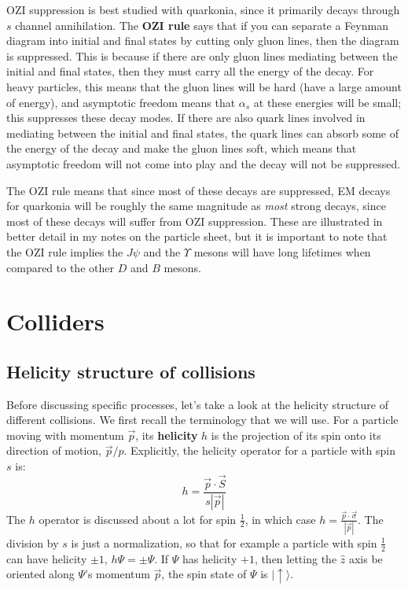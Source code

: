 \documentclass[11pt, oneside]{article}   	%
\theoremstyle{definition}
\numberwithin{equation}{subsection}		%
\begin{document}
OZI suppression is best studied with quarkonia, since it primarily decays through $s$ channel annihilation. The \textbf{OZI rule} 
says that if you can separate a Feynman diagram into initial and final states by cutting only gluon lines, then the diagram is suppressed. 
This is because if there are only gluon lines mediating between the initial and final states, then they must carry all the energy of the decay. 
For heavy particles, this means that the gluon lines will be hard (have a large amount of energy), and asymptotic freedom means that $\alpha_s$ at 
these energies will be small; this suppresses these decay modes. If there are also quark lines involved in mediating between the initial and 
final states, the quark lines can absorb some of the energy of the decay and make the gluon lines soft, which means that asymptotic freedom 
will not come into play and the decay will not be suppressed. 

The OZI rule means that 
since most of these decays are suppressed, EM decays for quarkonia will be roughly the same magnitude as \textit{most} strong decays, since 
most of these decays will suffer from OZI suppression. These are illustrated in better detail in my notes on the particle sheet, but it is important 
to note that the OZI rule implies the $J\psi$ and the $\Upsilon$ mesons will have long lifetimes when compared to the other $D$ and $B$ mesons. 


\section{Colliders}

\subsection{Helicity structure of collisions}

Before discussing specific processes, let's take a look at the helicity structure of different collisions. We first recall the terminology that we will use. 
For a particle moving with momentum $\vec p$, its \textbf{helicity} $h$ is the projection of its spin onto its direction of motion, $\vec p / p$. Explicitly, 
the helicity operator for a particle with spin $s$ is:
\begin{equation}
	h = \frac{\vec p\cdot \vec S}{s |\vec p|}
\end{equation}
The $h$ operator is discussed about a lot for spin $\frac{1}{2}$, in which case $h = \frac{\vec p\cdot\vec\sigma}{|\vec p|}$. The division by $s$ is just a normalization, so that 
for example a particle with spin $\frac{1}{2}$ can have helicity $\pm 1$, $h\Psi = \pm\Psi$. If $\Psi$ has helicity $+1$, then letting the $\hat z$ axis be oriented along 
$\Psi$'s momentum $\vec p$, the spin state of $\Psi$ is $|\uparrow\rangle$. 
\end{document}
